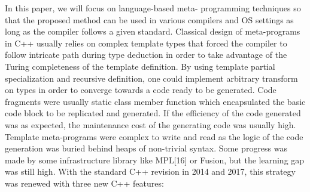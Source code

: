 \documentclass[../../main.tex]{subfiles}
\begin{document}
In this paper, we will focus on language-based meta-
programming techniques so that the proposed method can
be used in various compilers and OS settings as long as the
compiler follows a given standard.
Classical design of meta-programs in C++ usually relies
on complex template types that forced the compiler to follow
intricate path during type deduction in order to take advantage
of the Turing completeness of the template definition. By
using template partial specialization and recursive definition,
one could implement arbitrary transform on types in order
to converge towards a code ready to be generated. Code
fragments were usually static class member function which
encapsulated the basic code block to be replicated and
generated. If the efficiency of the code generated was as
expected, the maintenance cost of the generating code was
usually high. Template meta-programs were complex to write
and read as the logic of the code generation was buried
behind heaps of non-trivial syntax. Some progress was made
by some infrastructure library like MPL[16] or Fusion, but
the learning gap was still high.
With the standard C++ revision in 2014 and 2017, this
strategy was renewed with three new C++ features:
\end{document}
